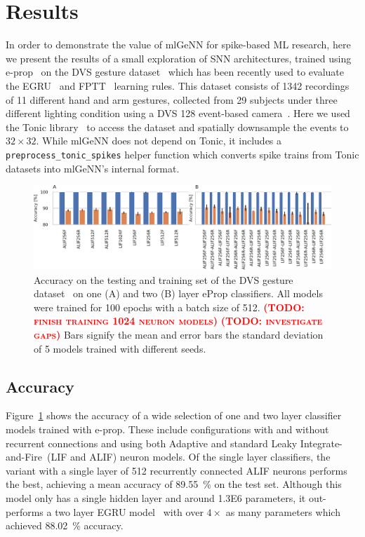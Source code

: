 \documentclass[sigconf]{acmart}
\newcommand{\todo}[1]{\textbf{\textsc{\textcolor{red}{(TODO: #1)}}}}
\begin{document}
\section{Results}
In order to demonstrate the value of mlGeNN for spike-based ML research, here we present the results of a small exploration of SNN architectures, trained using e-prop~\citep{Bellec2020} on the DVS gesture dataset~\citep{amir_low_2017} which has been recently used to evaluate the EGRU~\citep{subramoney2022egru} and FPTT~\citep{yin2021accurate} learning rules.
This dataset consists of \num{1342} recordings of \num{11} different hand and arm gestures, collected from \num{29} subjects under three different lighting condition using a DVS 128 event-based camera~\citep{lichtsteiner_128times128_2008}.
Here we used the Tonic library~\citep{lenz_gregor_2021_5079802} to access the dataset and spatially downsample the events to $32\times32$.
While mlGeNN does not depend on Tonic, it includes a \lstinline{preprocess_tonic_spikes} helper function which converts spike trains from Tonic datasets into mlGeNN's internal format.

\begin{figure}[t]
  \centering
  \includegraphics{figures/dense_accuracy.pdf}
  \caption{Accuracy on the testing and training set of the DVS gesture dataset~\citep{amir_low_2017} on one (A) and two (B) layer eProp classifiers.
  All models were trained for 100 epochs with a batch size of 512.
  \todo{finish training 1024 neuron models}
  \todo{investigate gaps}
  Bars signify the mean and error bars the standard deviation of 5 models trained with different seeds.}
  \label{fig:dense_accuracy}
\end{figure}

\subsection{Accuracy}
Figure~\ref{fig:dense_accuracy} shows the accuracy of a wide selection of one and two layer classifier models trained with e-prop.
These include configurations with and without recurrent connections and using both Adaptive and standard Leaky Integrate-and-Fire~(LIF and ALIF) neuron models.
Of the single layer classifiers, the variant with a single layer of 512 recurrently connected ALIF neurons performs the best, achieving a mean accuracy of \SI{89.55}{\percent} on the test set.
Although this model only has a single hidden layer and around \num{1.3E6} parameters, it out-performs a two layer EGRU model~\citep{subramoney2022egru} with over $4\times$ as many parameters which achieved \SI{88.02}{\percent} accuracy.
\end{document}
